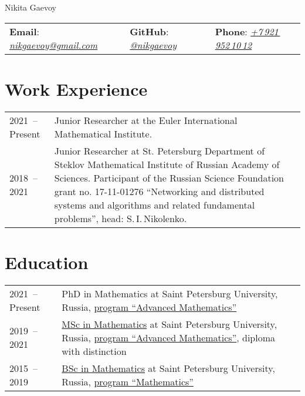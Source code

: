 \documentclass[a4paper, 11pt]{article}
\begin{document}


\begin{center}
	{\Huge Nikita Gaevoy}
\end{center}

\begin{center}
	\begin{tabular}{lll}
		\textbf{Email}: \href{mailto:nikgaevoy@gmail.com}{{\it nikgaevoy@gmail.com}} &
		\hspace{0.13cm} \textbf{GitHub}: \href{https://github.com/nikgaevoy}{{\it @nikgaevoy}} &
		\hspace{0.13cm} \textbf{Phone}: \href{tel:+79219521012}{{\it +7\,921\,952\,10\,12}}
	\end{tabular}
\end{center}

\section*{Work Experience}

\begin{tabularx}{\textwidth}{lX}
	2021~-- Present & Junior Researcher at the Euler International
	Mathematical Institute.
	\\
	2018~-- 2021 & Junior Researcher at St. Petersburg Department of Steklov Mathematical Institute of Russian Academy of Sciences. Participant of the Russian Science Foundation grant no. 17-11-01276 ``Networking and distributed systems and algorithms and related fundamental problems'', head: S.\,I.\,Nikolenko.
	\\
\end{tabularx}


\section*{Education}

\begin{tabularx}{\textwidth}{lX}
	2021~-- Present & PhD in Mathematics at Saint Petersburg University, Russia, \href{https://math-cs.spbu.ru/en/advanced-mathematics/}{program ``Advanced Mathematics''} \\
	2019~-- 2021 & \href{https://diploma.spbu.ru/s/?rn=3121007\&bd=19980122\&h=67a15239b3294582867a44ba9e42cf98}{MSc in Mathematics} at Saint Petersburg University, Russia, \href{https://math-cs.spbu.ru/en/msc-math-en/}{program ``Advanced Mathematics''}, diploma with distinction \\
	2015~-- 2019 & \href{https://diploma.spbu.ru/s/?rn=0911007\&bd=19980122\&h=a34dc3393d004d5fb149a60e3545b673}{BSc in Mathematics} at Saint Petersburg University, Russia, \href{https://math-cs.spbu.ru/en/}{program ``Mathematics''}
\end{tabularx}
\end{document}
